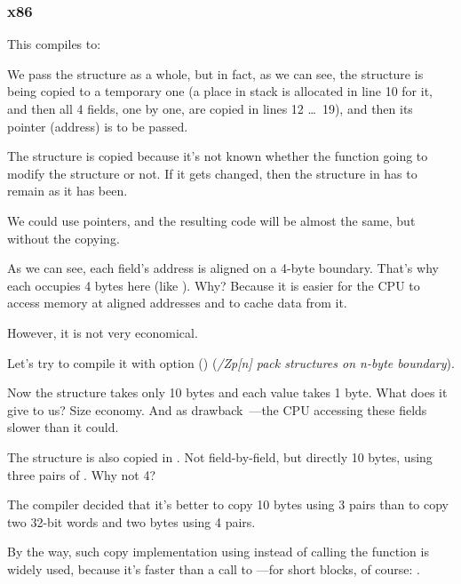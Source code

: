 ﻿\subsubsection{x86}

This compiles to:



We pass the structure as a whole, but in fact, as we can see, the structure
is being copied to a temporary one (a place in stack is allocated in line 10 for it,
and then all 4 fields, one by one, are copied in lines 12 \ldots\ 19), 
and then its pointer (address) is to be passed.

The structure is copied because it's not known whether the \ttf{} 
function going to modify the structure or not.
If it gets changed, then the structure in \main has to remain as it has been.

We could use \CCpp pointers, and the resulting code will be almost the same, but without
the copying.

As we can see, each field's address is aligned on a 4-byte boundary.
That's why each \Tchar occupies 4 bytes here (like \Tint). Why?
Because it is easier for the CPU to access memory at aligned addresses and to cache data from it.

However, it is not very economical.

Let's try to compile it with option () 
(\emph{/Zp[n] pack structures on n-byte boundary}).



Now the structure takes only 10 bytes and each \Tchar value takes 1 byte. What does it give to us?
Size economy. And as drawback~---the CPU accessing these fields slower than it could.

\label{short_struct_copying_using_MOV}

The structure is also copied in \main. Not field-by-field, but directly 10 bytes, using three pairs of \MOV.
Why not 4?

The compiler decided that it's better to copy 10 bytes using 3 \MOV pairs than to copy two 32-bit words
and two bytes using 4 \MOV pairs.

By the way, such copy implementation using \MOV instead of calling the  function is widely
used, because it's faster than a call to ---for short blocks, of course:
.

